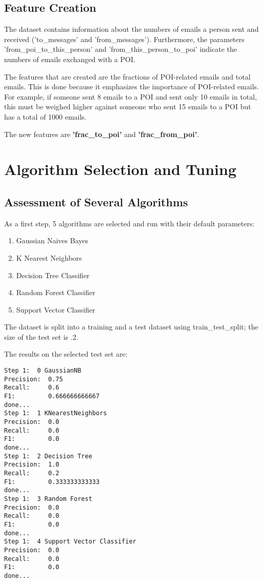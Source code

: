 \documentclass[11pt]{article} %
\begin{document}
\subsection{Feature Creation}

The dataset contains information about the numbers of emails a person sent and received ('to\_messages' and 'from\_messages'). Furthermore, the parameters 'from\_poi\_to\_this\_person' and 'from\_this\_person\_to\_poi' indicate the numbers of emails exchanged with a POI.\medskip

The features that are created are the fractions of POI-related emails and total emails. This is done because it emphasizes the importance of POI-related emails. For example, if someone sent 8 emails to a POI and sent only 10 emails in total, this must be weighed higher against someone who sent 15 emails to a POI but has a total of 1000 emails.\medskip

The new features are \textbf{'frac\_to\_poi'} and  \textbf{'frac\_from\_poi'}.

\section{Algorithm Selection and Tuning}

\subsection{Assessment of Several Algorithms}
As a first step, 5 algorithms are selected and run with their default parameters:
\begin{enumerate}
\item Gaussian Naives Bayes
\item K Nearest Neighbors
\item Decision Tree Classifier
\item Random Forest Classifier
\item Support Vector Classifier
\end{enumerate}

The dataset is split into a training and a test dataset using {\selectfont train\_test\_split}; the size of the test set is .2.\medskip

The results on the selected test set are:
\begin{verbatim}
Step 1:  0 GaussianNB
Precision:  0.75
Recall:     0.6
F1:         0.666666666667
done...
Step 1:  1 KNearestNeighbors
Precision:  0.0
Recall:     0.0
F1:         0.0
done...
Step 1:  2 Decision Tree
Precision:  1.0
Recall:     0.2
F1:         0.333333333333
done...
Step 1:  3 Random Forest
Precision:  0.0
Recall:     0.0
F1:         0.0
done...
Step 1:  4 Support Vector Classifier
Precision:  0.0
Recall:     0.0
F1:         0.0
done...
\end{verbatim}
\end{document}
